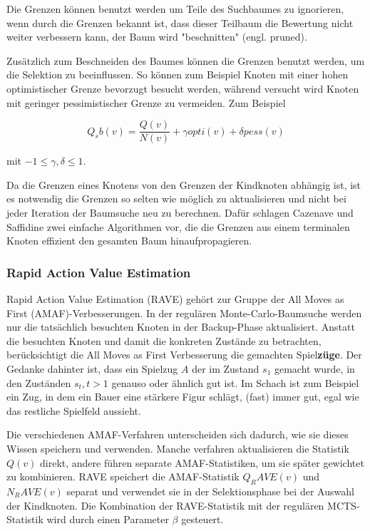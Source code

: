 Die Grenzen können benutzt werden um Teile des Suchbaumes zu ignorieren, wenn durch die Grenzen bekannt ist, dass dieser Teilbaum die Bewertung nicht weiter verbessern kann, der Baum wird "beschnitten" (engl. pruned).

Zusätzlich zum Beschneiden des Baumes können die Grenzen benutzt werden, um die Selektion zu beeinflussen. So können zum Beispiel Knoten mit einer hohen optimistischer Grenze bevorzugt besucht werden, während versucht wird Knoten mit geringer pessimistischer Grenze zu vermeiden. Zum Beispiel

\begin{equation}
Q_sb(v) = \frac{Q(v)}{N(v)} + \gamma opti(v) + \delta pess(v)
\label{eqn:scorebound}
\end{equation}

mit $-1 \le \gamma, \delta \le 1$.

Da die Grenzen eines Knotens von den Grenzen der Kindknoten abhängig ist, ist es notwendig die Grenzen so selten wie möglich zu aktualisieren und nicht bei jeder Iteration der Baumsuche neu zu berechnen. Dafür schlagen Cazenave und Saffidine zwei einfache Algorithmen vor, die die Grenzen aus einem terminalen Knoten effizient den gesamten Baum hinaufpropagieren.


\subsubsection{Rapid Action Value Estimation}

Rapid Action Value Estimation (RAVE) gehört zur Gruppe der All Moves as First (AMAF)-Verbesserungen. In der regulären Monte-Carlo-Baumsuche werden nur die tatsächlich besuchten Knoten in der Backup-Phase aktualisiert. Anstatt die besuchten Knoten und damit die konkreten Zustände zu betrachten, berücksichtigt die All Moves as First Verbesserung die gemachten Spiel\textbf{züge}. Der Gedanke dahinter ist, dass ein Spielzug $A$ der im Zustand $s_1$ gemacht wurde, in den Zuständen $s_t, t > 1$ genauso oder ähnlich gut ist. Im Schach ist zum Beispiel ein Zug, in dem ein Bauer eine stärkere Figur schlägt, (fast) immer gut, egal wie das restliche Spielfeld aussieht.

Die verschiedenen AMAF-Verfahren unterscheiden sich dadurch, wie sie dieses Wissen speichern und verwenden. Manche verfahren aktualisieren die Statistik $Q(v)$ direkt, andere führen separate AMAF-Statistiken, um sie später gewichtet zu kombinieren. RAVE speichert die AMAF-Statistik $Q_RAVE(v)$ und $N_RAVE(v)$ separat und verwendet sie in der Selektionsphase bei der Auswahl der Kindknoten. Die Kombination der RAVE-Statistik mit der regulären MCTS-Statistik wird durch einen Parameter $\beta$ gesteuert.


